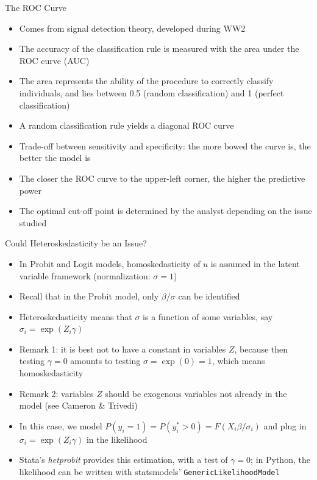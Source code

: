 \documentclass[aspectratio=169]{beamer}
\begin{document}
\begin{frame}{The ROC Curve}
\begin{itemize}
    \item Comes from signal detection theory, developed during WW2
    \item The accuracy of the classification rule is measured with the area under the ROC curve (AUC)
    \item The area represents the ability of the procedure to correctly classify individuals, and lies between 0.5 (random classification) and 1 (perfect classification)
    \item A random classification rule yields a diagonal ROC curve
    \item Trade-off between sensitivity and specificity: the more bowed the curve is, the better the model is
    \item The closer the ROC curve to the upper-left corner, the higher the predictive power
    \item The optimal cut-off point is determined by the analyst depending on the issue studied
\end{itemize}
\end{frame}

\begin{frame}{Could Heteroskedasticity be an Issue?}
\begin{itemize}
    \item In Probit and Logit models, homoskedasticity of $u$ is assumed in the latent variable framework (normalization: $\sigma = 1$)
    \item Recall that in the Probit model, only $\beta/\sigma$ can be identified
    \item Heteroskedasticity means that $\sigma$ is a function of some variables, say $\sigma_i = \exp(Z_i\gamma)$
    \item Remark 1: it is best not to have a constant in variables $Z$, because then testing $\gamma = 0$ amounts to testing $\sigma = \exp(0) = 1$, which means homoskedasticity
    \item Remark 2: variables $Z$ should be exogenous variables not already in the model (see Cameron \& Trivedi)
    \item In this case, we model $P(y_i = 1) = P(y_i^* > 0) = F(X_i\beta/\sigma_i)$ and plug in $\sigma_i = \exp(Z_i\gamma)$ in the likelihood
    \item Stata's \textit{hetprobit} provides this estimation, with a test of $\gamma = 0$; in Python, the likelihood can be written with statsmodels' \texttt{GenericLikelihoodModel}
\end{itemize}
\end{frame}
\end{document}
